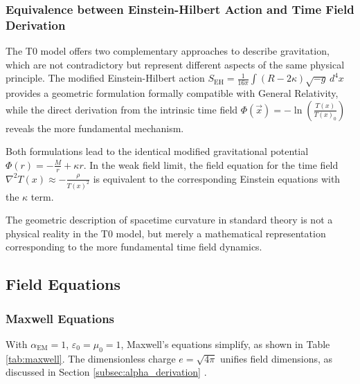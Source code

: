 \documentclass[12pt,a4paper]{article}
\newcommand{\Tfield}{T(x)}
\newcommand{\alphaEM}{\alpha_{\text{EM}}}
\begin{document}
\subsubsection{Equivalence between Einstein-Hilbert Action and Time Field Derivation}

The T0 model offers two complementary approaches to describe gravitation, which are not contradictory but represent different aspects of the same physical principle. The modified Einstein-Hilbert action $S_{\mathrm{EH}} = \frac{1}{16\pi} \int (R - 2\kappa) \sqrt{-g} \, d^4x$ provides a geometric formulation formally compatible with General Relativity, while the direct derivation from the intrinsic time field $\Phi(\vec{x}) = -\ln\left(\frac{\Tfield}{\Tfield_0}\right)$ reveals the more fundamental mechanism.

Both formulations lead to the identical modified gravitational potential $\Phi(r) = -\frac{M}{r} + \kappa r$. In the weak field limit, the field equation for the time field $\nabla^2\Tfield \approx -\frac{\rho}{\Tfield^2}$ is equivalent to the corresponding Einstein equations with the $\kappa$ term. 

The geometric description of spacetime curvature in standard theory is not a physical reality in the T0 model, but merely a mathematical representation corresponding to the more fundamental time field dynamics.	
	\subsection{Field Equations}
	\label{sec:field_equations}
	
	\subsubsection{Maxwell Equations}
	\label{subsec:maxwell}
	
	With \(\alphaEM = 1\), \(\varepsilon_0 = \mu_0 = 1\), Maxwell’s equations simplify, as shown in Table \ref{tab:maxwell}. The dimensionless charge \(e = \sqrt{4\pi}\) unifies field dimensions, as discussed in Section \ref{subsec:alpha_derivation} \cite{pascher_alpha_2025}.
	
\end{document}
